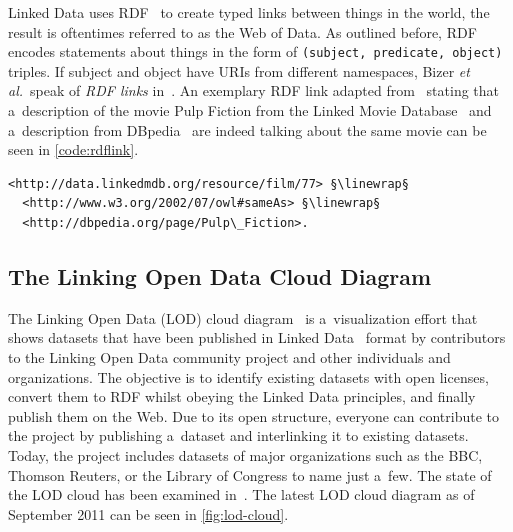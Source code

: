 Linked Data uses RDF~\cite{klyne2004rdf} to create
typed links between things in the world,
the result is oftentimes referred to as the Web of Data.
As outlined before, RDF encodes statements
about things in the form of
\texttt{(subject, predicate, object)} triples.
If subject and object have URIs from different namespaces,
Bizer \emph{et al.}\ speak of \emph{RDF links}
in~\cite{heath2011linkeddata}.
An exemplary RDF link adapted from~\cite{bizer2009linkeddatastory}
stating that a~description of the movie Pulp Fiction
from the Linked Movie Database~\cite{hassanzadeh2009linkedmovie}
and a~description from DBpedia~\cite{auer2007dbpedia}
are indeed talking about the same movie
can be seen in \autoref{code:rdflink}.

\begin{lstlisting}[caption={[Exemplary RDF link.]{Exemplary RDF
  link stating that a~description of the movie Pulp Fiction from
  the Linked Movie Database~\cite{hassanzadeh2009linkedmovie}
  and a~description from DBpedia are indeed talking
  about the same movie.}},
  label={code:rdflink},
  escapechar=§]
<http://data.linkedmdb.org/resource/film/77> §\linewrap§
  <http://www.w3.org/2002/07/owl#sameAs> §\linewrap§
  <http://dbpedia.org/page/Pulp\_Fiction>.
\end{lstlisting}

\subsection{The Linking Open Data Cloud Diagram}
\label{sec:lodcloud}

The Linking Open Data (LOD) cloud
diagram~\cite{cyganiak2011lodcloud} is a~visualization effort
that shows datasets that have been published in
Linked Data~\cite{bernerslee2006linkeddata}
format by contributors to the Linking Open Data community project
and other individuals and organizations.
The objective is to identify existing datasets with open licenses,
convert them to RDF whilst obeying the Linked Data principles,
and finally publish them on the Web.
Due to its open structure, everyone can contribute to the project by publishing a~dataset and
interlinking it to existing datasets.
Today, the project includes datasets of major organizations
such as the BBC, Thomson Reuters, or the Library of Congress
to name just a~few.
The state of the LOD cloud has been examined
in~\cite{bizer2011statelodcloud}.
The latest LOD cloud diagram as of September 2011 can be seen in \autoref{fig:lod-cloud}.

